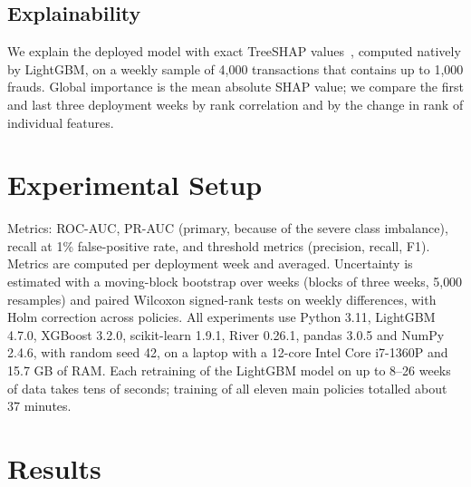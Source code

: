 \documentclass[conference]{IEEEtran}
\begin{document}
\subsection{Explainability}
We explain the deployed model with exact TreeSHAP values~\cite{lundberg2017shap}, computed natively by LightGBM, on a weekly sample of 4{,}000 transactions that contains up to 1{,}000 frauds.
Global importance is the mean absolute SHAP value; we compare the first and last three deployment weeks by rank correlation and by the change in rank of individual features.

\section{Experimental Setup}
Metrics: ROC-AUC, PR-AUC (primary, because of the severe class imbalance), recall at 1\% false-positive rate, and threshold metrics (precision, recall, F1).
Metrics are computed per deployment week and averaged. Uncertainty is estimated with a moving-block bootstrap over weeks (blocks of three weeks, 5{,}000 resamples)
and paired Wilcoxon signed-rank tests on weekly differences, with Holm correction across policies.
All experiments use Python 3.11, LightGBM 4.7.0, XGBoost 3.2.0, scikit-learn 1.9.1, River 0.26.1, pandas 3.0.5 and NumPy 2.4.6, with random seed 42, on a laptop with a 12-core Intel Core i7-1360P and 15.7 GB of RAM.
Each retraining of the LightGBM model on up to 8--26 weeks of data takes tens of seconds; training of all eleven main policies totalled about 37 minutes.
\section{Results}
\end{document}
